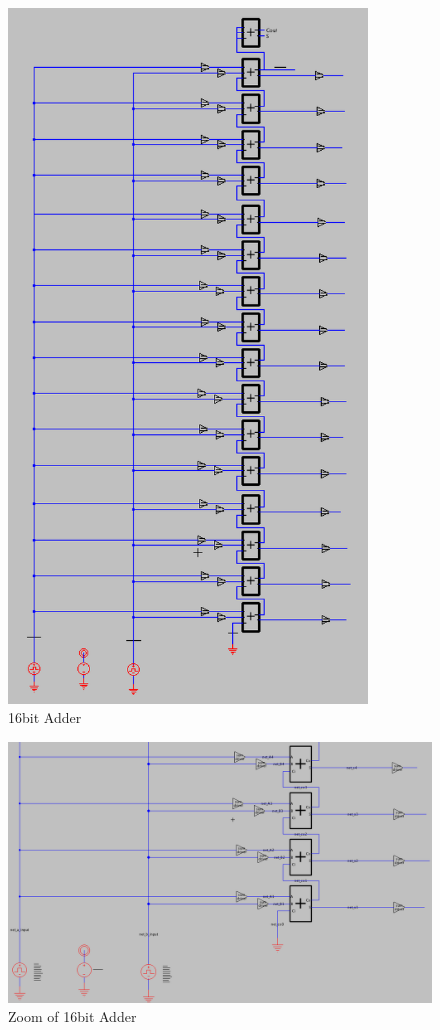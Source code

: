 \documentclass{article}
\begin{document}
\begin{figure}[H]
  \includegraphics[width=270pt]{baseline_screenshots/entire_adder.png}
  \caption{16bit Adder}
  \label{fig:baseline_16b_adder_sch}
\end{figure}

\begin{figure}[H]
  \includegraphics[width=\linewidth]{baseline_screenshots/zoomed_adder.png}
  \caption{Zoom of 16bit Adder}
  \label{fig:baseline_16b_adder_sch_zoomed}
\end{figure}
\end{document}
